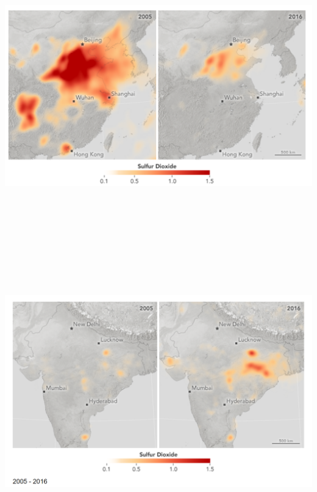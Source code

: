 \documentclass[
]{article}
\begin{document}
\includegraphics[width=\textwidth,height=4.6875in]{figures/m7_china_sulfur.png}

\hypertarget{section-7}{%
\subsection{}\label{section-7}}

\includegraphics[width=\textwidth,height=4.6875in]{figures/m7_india_sulfur.png}
\end{document}
